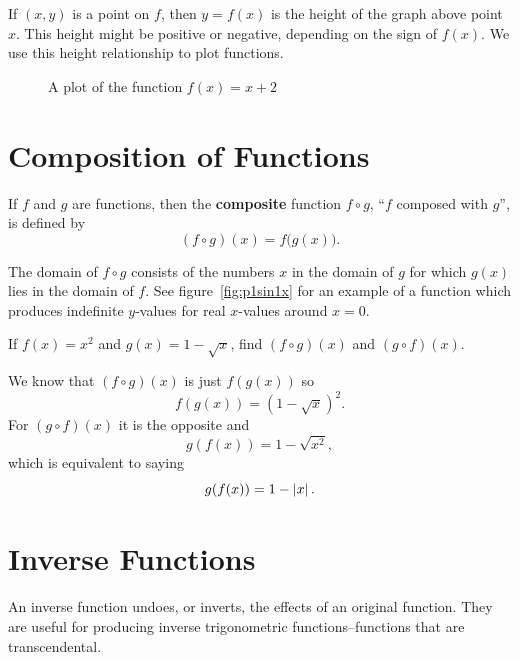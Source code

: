 If $ (x,y) $ is a point on $f$, then $y=f(x)$ is the height of the graph above point $x$.
This height might be positive or negative, depending on the sign of $f(x)$.
We use this height relationship to plot functions.
\begin{figure}[H]
    \begin{center}
      \caption{A plot of the function $f(x)=x+2$}
    \end{center}
  \end{figure}

\section{Composition of Functions}
\label{sec:compositefunctions}
\begin{defn}
  If $f$ and $g$ are functions, then the \textbf{composite} function 
  $f \circ g$, ``$f$ composed with $g$'', is defined by
  \[ (f \circ g)(x)=f\bigl(g(x)\bigr) \text{.} \]
  \begin{remark}
    The domain of $ f \circ g $ consists of the numbers $x$ in the domain of 
    $g$ for which $g(x)$ lies in the domain of $f$.
    See figure~\ref{fig:p1sin1x} for an example of a function which produces 
    indefinite $y$-values for real $x$-values around $x=0$.
  \end{remark}
\end{defn}
\begin{ex}
  If
  $f(x)=x^2$
  and
  $g(x)=1-\sqrt{x}$,
  find $ (f \circ g)(x) $ and $ (g \circ f)(x)$.
  \begin{sol}
      We know that $(f \circ g)(x)$ is just $f(g(x))$ so
      \[ f(g(x)) = (1 - \sqrt x )^2. \] For $(g \circ f)(x)$ it is the opposite
      and \[ g(f(x)) = 1 - \sqrt{x^2} ,\]
      which is equivalent to saying \[ g(f(x)) = 1 - \left|x\right|. \]
  \end{sol}
\end{ex}

\section{Inverse Functions}\label{sec:inverse}
An inverse function undoes, or inverts, the effects of an original function.
They are useful for producing inverse trigonometric functions--functions that 
are transcendental.

